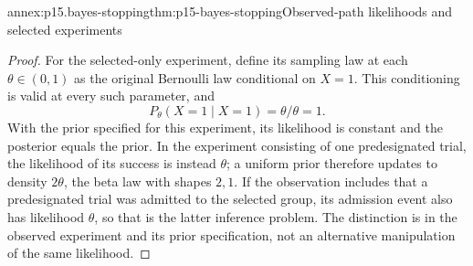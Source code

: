 \begin{annexitem}{annex:p15.bayes-stopping}{thm:p15-bayes-stopping}{Observed-path likelihoods and selected experiments}
\begin{proof}
For the selected-only experiment, define its sampling
law at each \(\theta\in(0,1)\) as the original Bernoulli
law conditional on \(X=1\). This conditioning is valid
at every such parameter, and
\[
             P_\theta(X=1\mid X=1)=\theta/\theta=1.
\]
With the prior specified for this experiment, its
likelihood is constant and the posterior equals the prior.
In the experiment consisting of one predesignated
trial, the likelihood of its success is instead
\(\theta\); a uniform prior therefore updates to density
\(2\theta\), the beta law with shapes \(2,1\).
If the observation includes that a predesignated trial
was admitted to the selected group, its admission event
also has likelihood \(\theta\), so that is the latter
inference problem. The distinction is in the observed
experiment and its prior specification, not an
alternative manipulation of the same likelihood.
\end{proof}
\end{annexitem}
